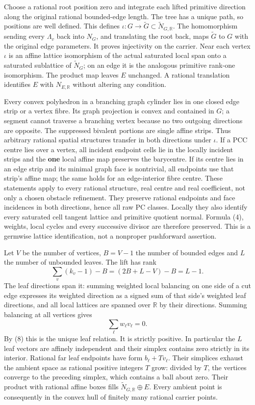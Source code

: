 \documentclass[
  11pt,
]{article}
\begin{document}
Choose a rational root position zero and integrate each lifted primitive
direction along the original rational bounded-edge length. The tree has
a unique path, so positions are well defined. This defines
\(\iota:G\to\widetilde G\subset\widetilde N_{G,\mathbb R}\). The
homomorphism sending every \(\Lambda_v\) back into \(N_G\), and
translating the root back, maps \(\widetilde G\) to \(G\) with the
original edge parameters. It proves injectivity on the carrier. Near
each vertex \(\iota\) is an affine lattice isomorphism of the actual
saturated local span onto a saturated sublattice of \(\widetilde N_G\);
on an edge it is the analogous primitive rank-one isomorphism. The
product map leaves \(E\) unchanged. A rational translation identifies
\(E\) with \(N_{E,\mathbb R}\) without altering any condition.

Every convex polyhedron in a branching graph cylinder lies in one closed
edge strip or a vertex fibre. Its graph projection is convex and
contained in \(G\); a segment cannot traverse a branching vertex because
no two outgoing directions are opposite. The suppressed bivalent
portions are single affine strips. Thus arbitrary rational spatial
structures transfer in both directions under \(\iota\). If a PCC centre
lies over a vertex, all incident endpoint cells lie in the locally
incident strips and the \textbf{one} local affine map preserves the
barycentre. If its centre lies in an edge strip and its minimal graph
face is nontrivial, all endpoints use that strip's affine map; the same
holds for an edge-interior fibre centre. These statements apply to every
rational structure, real centre and real coefficient, not only a chosen
obstacle refinement. They preserve rational endpoints and face
incidences in both directions, hence all raw PC classes. Locally they
also identify every saturated cell tangent lattice and primitive
quotient normal. Formula (4), weights, local cycles and every successive
divisor are therefore preserved. This is a germwise lattice
identification, not a nonproper pushforward assertion.

Let \(V\) be the number of vertices, \(B=V-1\) the number of bounded
edges and \(L\) the number of unbounded leaves. The lift has rank
\[\sum_v(k_v-1)-B=(2B+L-V)-B=L-1. \tag{8}\] The leaf directions span it:
summing weighted local balancing on one side of a cut edge expresses its
weighted direction as a signed sum of that side's weighted leaf
directions, and all local lattices are spanned over \(\mathbb R\) by
their directions. Summing balancing at all vertices gives
\[\sum_{\ell}w_\ell v_\ell=0. \tag{9}\] By (8) this is the unique leaf
relation. It is strictly positive. In particular the \(L\) leaf vectors
are affinely independent and their simplex contains zero strictly in its
interior. Rational far leaf endpoints have form \(b_\ell+T v_\ell\).
Their simplices exhaust the ambient space as rational positive integers
\(T\) grow: divided by \(T\), the vertices converge to the preceding
simplex, which contains a ball about zero. Their product with rational
affine boxes fills \(\widetilde N_{G,\mathbb R}\oplus E\). Every ambient
point is consequently in the convex hull of finitely many rational
carrier points.
\end{document}
